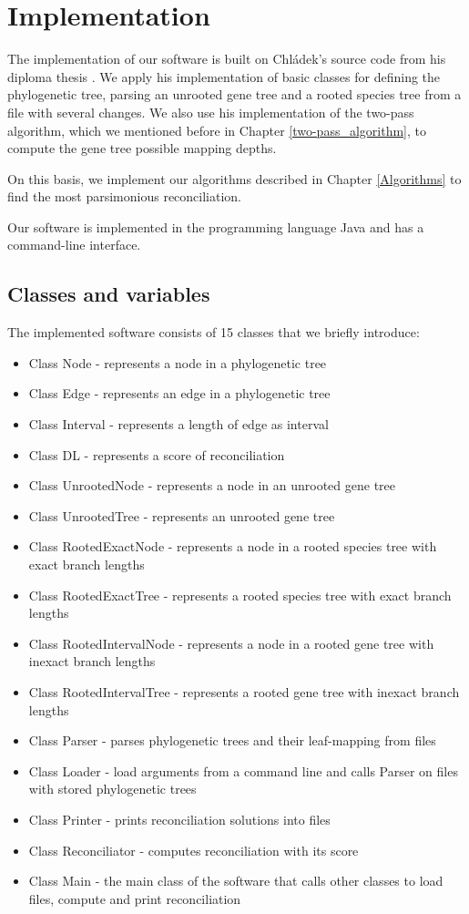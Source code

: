 \chapter{Implementation}

The implementation of our software is built on Chládek's source code from his diploma thesis \cite{chladek_thesis}. We apply his implementation of basic classes for defining the phylogenetic tree, parsing an unrooted gene tree and a rooted species tree from a file with several changes. We also use his implementation of the two-pass algorithm, which we mentioned before in Chapter \ref{two-pass_algorithm}, to compute the gene tree possible mapping depths.

On this basis, we implement our algorithms described in Chapter \ref{Algorithms} to find the most parsimonious reconciliation.

Our software is implemented in the programming language Java and has a command-line interface.

\section{Classes and variables}
The implemented software consists of 15 classes that we briefly introduce:
\begin{itemize}
  \item Class Node - represents a node in a phylogenetic tree
  \item Class Edge - represents an edge in a phylogenetic tree
  \item Class Interval - represents a length of edge as interval
  \item Class DL - represents a score of reconciliation
  \item Class UnrootedNode - represents a node in an unrooted gene tree
  \item Class UnrootedTree - represents an unrooted gene tree
  \item Class RootedExactNode - represents a node in a rooted species tree with exact branch lengths
  \item Class RootedExactTree - represents a rooted species tree with exact branch lengths
  \item Class RootedIntervalNode - represents a node in a rooted gene tree with inexact branch lengths
  \item Class RootedIntervalTree - represents a rooted gene tree with inexact branch lengths
  \item Class Parser - parses phylogenetic trees and their leaf-mapping from files
  \item Class Loader - load arguments from a command line and calls Parser on files with stored phylogenetic trees
  \item Class Printer - prints reconciliation solutions into files
  \item Class Reconciliator - computes reconciliation with its score
  \item Class Main - the main class of the software that calls other classes to load files, compute and print reconciliation
\end{itemize}

